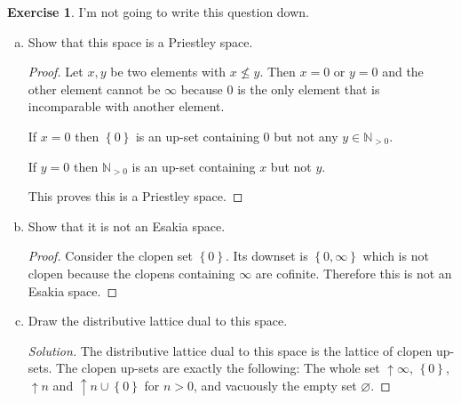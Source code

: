 \documentclass{article}
\newcommand{\N}{\mathbb{N}}
\newcommand{\set}[1]{\left\{#1\right\}}
\renewcommand{\qedsymbol}{\raisebox{-0.5cm}{}}
\newenvironment{solution}{\begin{proof}[Solution]\renewcommand\qedsymbol{}}{\end{proof}}
\theoremstyle{definition}
\newtheorem{question}{Exercise}
\begin{document}
\begin{question}
    I'm not going to write this question down.

    \begin{enumerate}[(a)]
        \item Show that this space is a Priestley space.

              \begin{proof}
                  Let \(x,y\) be two elements with \(x\nleq y\). Then \(x=0\) or
                  \(y=0\) and the other element cannot be \(\infty\) because
                  \(0\) is the only element that is incomparable with another
                  element.

                  If \(x=0\) then \(\set{0}\) is an up-set containing \(0\) but
                  not any \(y\in\N_{>0}\).

                  If \(y=0\) then \(\N_{>0}\) is an up-set containing
                  \(x\) but not \(y\).

                  This proves this is a Priestley space.
              \end{proof}

        \item Show that it is not an Esakia space.

              \begin{proof}
                  Consider the clopen set \(\set{0}\). Its downset is
                  \(\set{0,\infty}\) which is not clopen because the clopens
                  containing \(\infty\) are cofinite. Therefore this is not an
                  Esakia space.
              \end{proof}

        \item Draw the distributive lattice dual to this space.

              \begin{solution}
                  The distributive lattice dual to this space is the lattice of
                  clopen up-sets. The clopen up-sets are exactly the following:
                  The whole set \(\uparrow\infty\), \(\set{0}\), \(\uparrow n\)
                  and \(\uparrow n\cup\set{0}\) for \(n>0\), and vacuously the
                  empty set \(\varnothing\).


\end{solution}
\end{enumerate}
\end{question}
\end{document}
